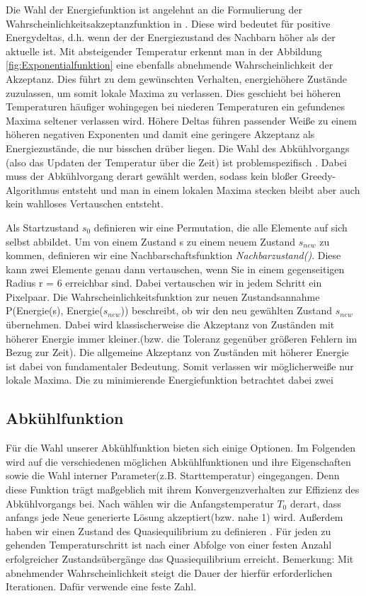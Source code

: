 Die Wahl der Energiefunktion ist angelehnt an die Formulierung der 
Wahrscheinlichkeitsakzeptanzfunktion in \cite{Kirkpatrick671}. 
Diese wird bedeutet für positive Energydeltas, d.h. wenn der der Energiezustand
des Nachbarn höher als der aktuelle ist. Mit absteigender Temperatur erkennt man 
in der Abbildung \ref{fig:Exponentialfunktion} eine ebenfalls abnehmende Wahrscheinlichkeit
der Akzeptanz. Dies führt zu dem gewünschten Verhalten, energiehöhere Zustände 
zuzulassen, um somit lokale Maxima zu verlassen. Dies geschieht bei höheren 
Temperaturen häufiger wohingegen bei niederen Temperaturen ein gefundenes Maxima
seltener verlassen wird. Höhere Deltas führen passender Weiße zu einem höheren negativen 
Exponenten und damit eine geringere Akzeptanz als Energiezustände, die nur bisschen 
drüber liegen. Die Wahl des Abkühlvorgangs (also das Updaten der Temperatur über die Zeit)
ist problemspezifisch \cite[S. 9]{Kirkpatrick671}. Dabei muss der Abkühlvorgang derart
gewählt werden, sodass kein bloßer Greedy-Algorithmus entsteht und man in einem lokalen 
Maxima stecken bleibt aber auch kein wahlloses Vertauschen entsteht.

Als Startzustand $s_{0}$ definieren wir eine Permutation, die alle 
Elemente auf sich selbst abbildet.
Um von einem Zustand s zu einem neuem Zustand $s_{new}$ zu kommen,
definieren wir eine Nachbarschaftsfunktion \textit{Nachbarzustand()}. 
Diese kann zwei Elemente genau dann vertauschen, wenn Sie in einem 
gegenseitigen Radius r = 6 erreichbar sind. Dabei vertauschen wir
in jedem Schritt ein Pixelpaar. 
Die Wahrscheinlichkeitsfunktion zur neuen Zustandsannahme
P(Energie(s), Energie($s_{new}$)) beschreibt, ob wir den neu
gewählten Zustand $s_{new}$ übernehmen. Dabei wird klassischerweise die
Akzeptanz von Zuständen mit höherer Energie immer kleiner.(bzw. die 
Toleranz gegenüber größeren Fehlern im Bezug zur Zeit). Die allgemeine Akzeptanz von 
Zuständen mit höherer Energie ist dabei von fundamentaler Bedeutung.
Somit verlassen wir möglicherweiße nur lokale Maxima.
Die zu minimierende Energiefunktion  betrachtet
dabei zwei 

\subsection{Abkühlfunktion}
Für die Wahl unserer Abkühlfunktion bieten sich einige Optionen.\cite{coolDownOverview}
Im Folgenden wird auf die verschiedenen möglichen Abkühlfunktionen und ihre Eigenschaften
sowie die Wahl interner Parameter(z.B. Starttemperatur) eingegangen. Denn diese Funktion
trägt maßgeblich mit ihrem Konvergenzverhalten zur Effizienz des Abkühlvorgangs bei.
Nach \cite{Kirkpatrick671} wählen wir die Anfangstemperatur $T_0$ derart, dass anfangs jede Neue generierte Lösung akzeptiert(bzw. nahe 1) wird.
Außerdem haben wir einen Zustand des Quasiequilibrium zu definieren \cite{ScienceDirectCoolingSchedule}.
Für jeden zu gehenden Temperaturschritt ist nach einer Abfolge von einer festen Anzahl erfolgreicher
Zustandsübergänge das Quasiequilibrium erreicht. Bemerkung: Mit abnehmender Wahrscheinlichkeit
steigt die Dauer der hierfür erforderlichen Iterationen. Dafür verwende eine feste Zahl.


